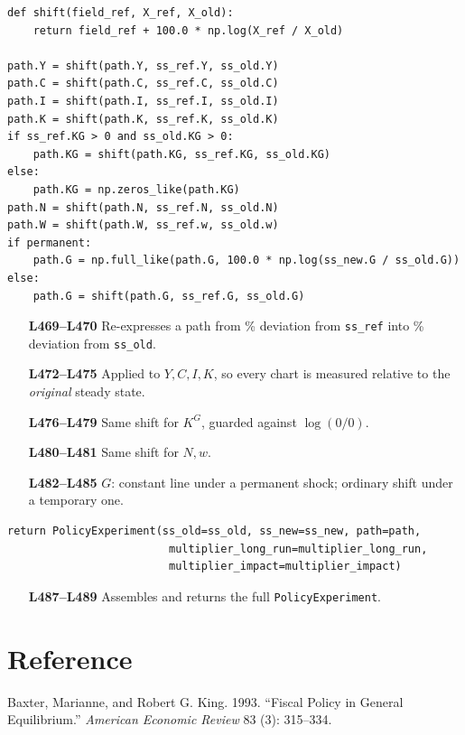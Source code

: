 \documentclass[11pt]{article}
\begin{document}
\begin{lstlisting}[firstnumber=469]
def shift(field_ref, X_ref, X_old):
    return field_ref + 100.0 * np.log(X_ref / X_old)

path.Y = shift(path.Y, ss_ref.Y, ss_old.Y)
path.C = shift(path.C, ss_ref.C, ss_old.C)
path.I = shift(path.I, ss_ref.I, ss_old.I)
path.K = shift(path.K, ss_ref.K, ss_old.K)
if ss_ref.KG > 0 and ss_old.KG > 0:
    path.KG = shift(path.KG, ss_ref.KG, ss_old.KG)
else:
    path.KG = np.zeros_like(path.KG)
path.N = shift(path.N, ss_ref.N, ss_old.N)
path.W = shift(path.W, ss_ref.w, ss_old.w)
if permanent:
    path.G = np.full_like(path.G, 100.0 * np.log(ss_new.G / ss_old.G))
else:
    path.G = shift(path.G, ss_ref.G, ss_old.G)
\end{lstlisting}
\begin{itemize}
\item[\textbf{L469--L470}] Re-expresses a path from \% deviation from
\texttt{ss\_ref} into \% deviation from \texttt{ss\_old}.
\item[\textbf{L472--L475}] Applied to $Y,C,I,K$, so every chart is measured
relative to the \emph{original} steady state.
\item[\textbf{L476--L479}] Same shift for $K^G$, guarded against
$\log(0/0)$.
\item[\textbf{L480--L481}] Same shift for $N,w$.
\item[\textbf{L482--L485}] $G$: constant line under a permanent shock;
ordinary shift under a temporary one.
\end{itemize}

\begin{lstlisting}[firstnumber=487]
return PolicyExperiment(ss_old=ss_old, ss_new=ss_new, path=path,
                         multiplier_long_run=multiplier_long_run,
                         multiplier_impact=multiplier_impact)
\end{lstlisting}
\begin{itemize}
\item[\textbf{L487--L489}] Assembles and returns the full
\texttt{PolicyExperiment}.
\end{itemize}

\section*{Reference}
\noindent Baxter, Marianne, and Robert G. King. 1993. ``Fiscal Policy in General Equilibrium.'' \textit{American Economic Review} 83 (3): 315--334.
\end{document}
